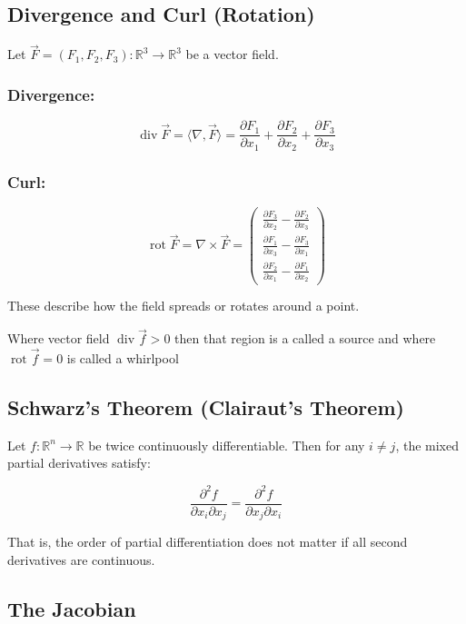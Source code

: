 \subsection{Divergence and Curl (Rotation)}

Let \( \vec{F} = (F_1, F_2, F_3) : \mathbb{R}^3 \to \mathbb{R}^3 \) be a vector field.

\subsubsection{Divergence:}
\[
\operatorname{div} \vec{F} = \langle\nabla, \vec{F}\rangle = \frac{\partial F_1}{\partial x_1} + \frac{\partial F_2}{\partial x_2} + \frac{\partial F_3}{\partial x_3}
\]

\subsubsection{Curl:}
\[
\operatorname{rot} \vec{F} = \nabla \times \vec{F} = \begin{pmatrix}
\frac{\partial F_3}{\partial x_2} - \frac{\partial F_2}{\partial x_3} \\
\frac{\partial F_1}{\partial x_3} - \frac{\partial F_3}{\partial x_1} \\
\frac{\partial F_2}{\partial x_1} - \frac{\partial F_1}{\partial x_2}
\end{pmatrix}
\]

These describe how the field spreads or rotates around a point.

Where vector field \( \operatorname{div}\vec{f} > 0\) then that region is a called a source
and where \(\operatorname{rot}\vec{f} = 0\) is called a whirlpool

\subsection{Schwarz’s Theorem (Clairaut’s Theorem)}

Let \( f : \mathbb{R}^n \to \mathbb{R} \) be twice continuously differentiable. Then for any \( i \ne j \), the mixed partial derivatives satisfy:

\[
\frac{\partial^2 f}{\partial x_i \partial x_j} = \frac{\partial^2 f}{\partial x_j \partial x_i}
\]

That is, the order of partial differentiation does not matter if all second derivatives are continuous.

\subsection{The Jacobian}

